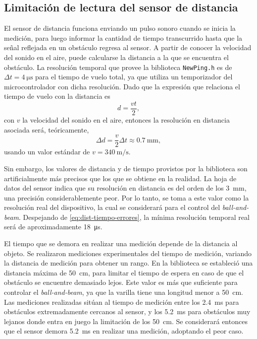 \subsection{Limitación de lectura del sensor de distancia}

El sensor de distancia funciona enviando un pulso sonoro cuando se inicia la medición, para luego informar la cantidad de tiempo transcurrido hasta que la señal reflejada en un obstáculo regresa al sensor. A partir de conocer la velocidad del sonido en el aire, puede calcularse la distancia a la que se encuentra el obstáculo. La resolución temporal que provee la biblioteca \verb|NewPing.h| es de $\Delta t = \qty{4}{\us}$ para el tiempo de vuelo total, ya que utiliza un temporizador del microcontrolador con dicha resolución. Dado que la expresión que relaciona el tiempo de vuelo con la distancia es
\begin{equation*}
    d = \frac{v t}{2},
\end{equation*}
con $v$ la velocidad del sonido en el aire, entonces la resolución en distancia asociada será, teóricamente,
\begin{equation}
    \label{eq:dist-tiempo-errores}
    \Delta d = \frac{v}{2} \Delta t \approx \qty{0.7}{\mm},
\end{equation}
usando un valor estándar de $v = \qty{340}{\m\per\s}$.

Sin embargo, los valores de distancia y de tiempo provistos por la biblioteca son artificialmente más precisos que los que se obtiene en la realidad. La hoja de datos del sensor indica que su resolución en distancia es del orden de los \qty{3}{\mm}, una precisión considerablemente peor. Por lo tanto, se toma a este valor como la resolución real del dispositivo, la cual se considerará para el control del \emph{ball-and-beam}. Despejando de \eqref{eq:dist-tiempo-errores}, la mínima resolución temporal real será de aproximadamente \qty{18}{\us}.

El tiempo que se demora en realizar una medición depende de la distancia al objeto. Se realizaron mediciones experimentales del tiempo de medición, variando la distancia de medición para obtener un rango. En la biblioteca se estableció una distancia máxima de \qty{50}{\cm}, para limitar el tiempo de espera en caso de que el obstáculo se encuentre demasiado lejos. Este valor es más que suficiente para controlar el \emph{ball-and-beam}, ya que la varilla tiene una longitud menor a \qty{50}{\cm}. Las mediciones realizadas sitúan al tiempo de medición entre los \qty{2.4}{\ms} para obstáculos extremadamente cercanos al sensor, y los \qty{5.2}{\ms} para obstáculos muy lejanos donde entra en juego la limitación de los \qty{50}{\cm}. Se considerará entonces que el sensor demora \qty{5.2}{\ms} en realizar una medición, adoptando el peor caso.

